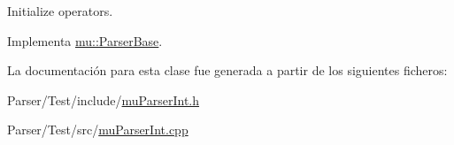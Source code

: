 Initialize operators. 



Implementa \hyperlink{classmu_1_1_parser_base_a4df16813c9002ff08c96929ba8f0d32b}{mu\+::\+Parser\+Base}.



La documentación para esta clase fue generada a partir de los siguientes ficheros\+:\begin{DoxyCompactItemize}
\item 
Parser/\+Test/include/\hyperlink{mu_parser_int_8h}{mu\+Parser\+Int.\+h}\item 
Parser/\+Test/src/\hyperlink{mu_parser_int_8cpp}{mu\+Parser\+Int.\+cpp}\end{DoxyCompactItemize}
